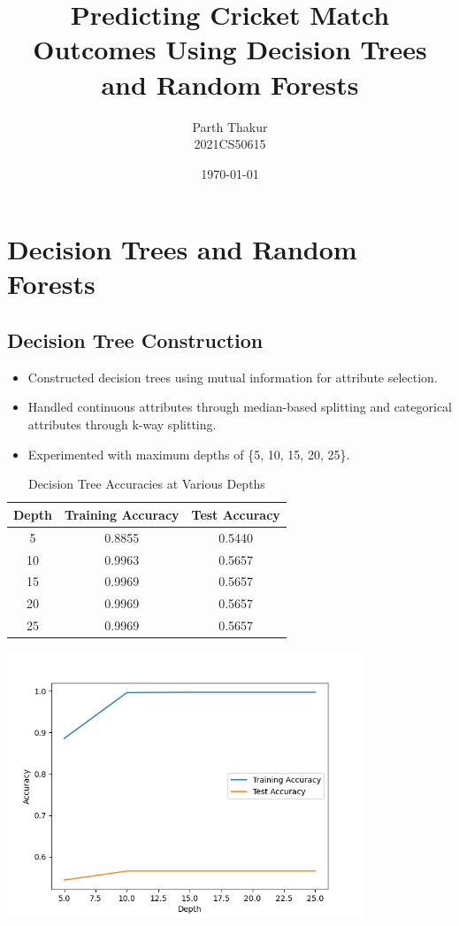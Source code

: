 \documentclass[12pt]{article}
\begin{document}
\title{Predicting Cricket Match Outcomes Using Decision Trees and Random Forests}
\author{Parth Thakur\\
        2021CS50615}

\date{\today}

\section{Decision Trees and Random Forests}
\subsection{Decision Tree Construction}
    \begin{itemize}
        \item Constructed decision trees using mutual information for attribute selection.
        \item Handled continuous attributes through median-based splitting and categorical attributes through k-way splitting.
        \item Experimented with maximum depths of \{5, 10, 15, 20, 25\}.
    \end{itemize}


\begin{table}[H]
\centering
\caption{Decision Tree Accuracies at Various Depths}
\label{table:decision_tree_accuracies}
\begin{tabular}{ccc}
\toprule
Depth & Training Accuracy & Test Accuracy \\
\midrule
5  & 0.8855 & 0.5440 \\
10 & 0.9963 & 0.5657 \\
15 & 0.9969 & 0.5657 \\
20 & 0.9969 & 0.5657 \\
25 & 0.9969 & 0.5657 \\
\bottomrule
\end{tabular}
\end{table}

\begin{center}
    \includegraphics[width=0.8\textwidth]{Assignment 3/q1/(a)depth_vs_accuracy.png}
\end{center}
\end{document}
